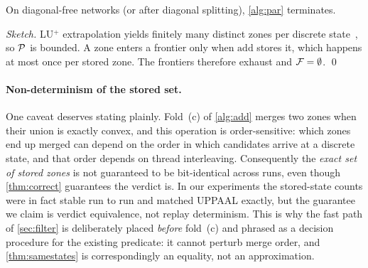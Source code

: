 \begin{theorem}[Termination]\label{thm:term}
On diagonal-free networks (or after diagonal splitting), \cref{alg:par}
terminates.
\end{theorem}
\begin{proof}[Sketch]
LU$^+$ extrapolation yields finitely many distinct zones per discrete
state~\cite{Behrmann06}, so $\mathcal{P}$ is bounded.  A zone enters a frontier only
when $\mathrm{add}$ stores it, which happens at most once per stored zone.  The
frontiers therefore exhaust and $\mathcal{F} = \emptyset$. \qed
\end{proof}

\paragraph{Non-determinism of the stored set.}
One caveat deserves stating plainly.  Fold~(c) of \cref{alg:add} merges two zones
when their union is exactly convex, and this operation is order-sensitive: which
zones end up merged can depend on the order in which candidates arrive at a
discrete state, and that order depends on thread interleaving.  Consequently the
\emph{exact set of stored zones} is not guaranteed to be bit-identical across
runs, even though \cref{thm:correct} guarantees the verdict is.  In our
experiments the stored-state counts were in fact stable run to run and matched
UPPAAL exactly, but the guarantee we claim is verdict equivalence, not replay
determinism.  This is why the fast path of \cref{sec:filter} is deliberately
placed \emph{before} fold~(c) and phrased as a decision procedure for the
existing predicate: it cannot perturb merge order, and \cref{thm:samestates} is
correspondingly an equality, not an approximation.
